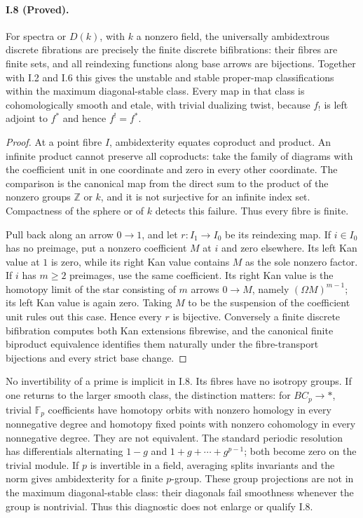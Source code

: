 \paragraph{I.8 (Proved).}
For spectra or $D(k)$, with $k$ a nonzero field, the universally
ambidextrous discrete fibrations are precisely the finite
discrete bifibrations: their fibres are finite sets, and all
reindexing functions along base arrows are bijections. Together
with I.2 and I.6 this gives the unstable and stable proper-map
classifications within the maximum diagonal-stable class.
Every map in that class is cohomologically smooth and etale,
with trivial dualizing twist, because $f_!$ is left adjoint to
$f^*$ and hence $f^!=f^*$.
\begin{proof}
At a point fibre $I$, ambidexterity equates coproduct and product.
An infinite product cannot preserve all coproducts: take the
family of diagrams with the coefficient unit in one coordinate
and zero in every other coordinate. The comparison is the
canonical map from the direct sum to the product of the
nonzero groups $\mathbb Z$ or $k$, and it is not surjective
for an infinite index set. Compactness of the sphere or of
$k$ detects this failure. Thus every fibre is finite.

Pull back along an arrow $0\to1$, and let
$r:I_1\to I_0$ be its reindexing map. If $i\in I_0$ has no
preimage, put a nonzero coefficient $M$ at $i$ and zero
elsewhere. Its left Kan value at $1$ is zero, while its right
Kan value contains $M$ as the sole nonzero factor. If $i$ has
$m\geq2$ preimages, use the same coefficient. Its right Kan
value is the homotopy limit of the star consisting of $m$
arrows $0\to M$, namely $(\Omega M)^{m-1}$; its left Kan
value is again zero. Taking $M$ to be the suspension of the
coefficient unit rules out this case. Hence every $r$ is
bijective. Conversely a finite discrete bifibration computes
both Kan extensions fibrewise, and the canonical finite
biproduct equivalence identifies them naturally under the
fibre-transport bijections and every strict base change.
\end{proof}

No invertibility of a prime is implicit in I.8. Its fibres have
no isotropy groups. If one returns to the larger smooth class,
the distinction matters: for $BC_p\to*$, trivial
$\mathbb F_p$ coefficients have homotopy orbits with nonzero
homology in every nonnegative degree and homotopy fixed points
with nonzero cohomology in every nonnegative degree. They are
not equivalent. The standard periodic resolution has
differentials alternating $1-g$ and $1+g+\cdots+g^{p-1}$;
both become zero on the trivial module. If $p$ is invertible
in a field, averaging splits invariants and the norm gives
ambidexterity for a finite $p$-group. These group projections
are not in the maximum diagonal-stable class: their diagonals
fail smoothness whenever the group is nontrivial. Thus this
diagnostic does not enlarge or qualify I.8.

